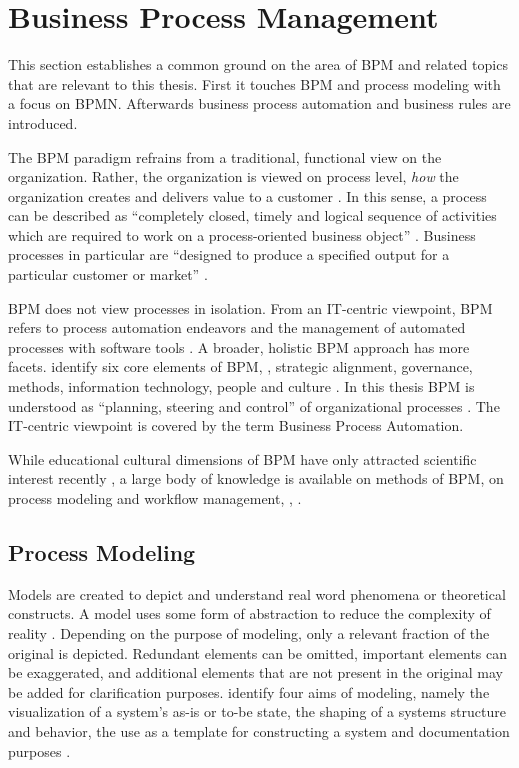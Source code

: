 \pagebreak
\section{Business Process Management}

This section establishes a common ground on the area of \ac{BPM} and related topics that are relevant to this thesis. First it touches \ac{BPM} and process modeling with a focus on \ac{BPMN}. Afterwards business process automation and business rules are introduced.

The \ac{BPM} paradigm refrains from a traditional, functional view on the organization. Rather, the organization is viewed on process level, \ie \textit{how} the organization creates and delivers value to a customer \citep[]{Davenport1993}. In this sense, a process can be described as \enquote{completely closed, timely and logical sequence of activities which are required to work on a process-oriented business object} \citep[]{Becker2003}. Business processes in particular are \enquote{designed to produce a specified output for a particular customer or market} \citep[]{Davenport1993}.

\ac{BPM} does not view processes in isolation. From an IT-centric viewpoint, \ac{BPM} refers to process automation endeavors and the management of automated processes with software tools \citep[]{Harmon2003}.  A broader, holistic \ac{BPM} approach has more facets. \cite{Rosemann2005} identify six core elements of \ac{BPM}, \viz, strategic alignment, governance, methods, information technology, people and culture \citep[see also][]{Rosemann2015}. In this thesis \ac{BPM} is understood as \enquote{planning, steering and control} of organizational processes \citep[]{Becker2003}. The IT-centric viewpoint is covered by the term Business Process Automation.

While educational \resp cultural dimensions of \ac{BPM} have only attracted scientific interest recently  \citep[]{VomBrocke2014a}, a large body of knowledge is available on methods of \ac{BPM}, \esp on process modeling and workflow management, \eg, \cite{Becker2011,Dumas2013,VomBrocke2015,VanderAalst2000}.

\subsection{Process Modeling}

Models are created to depict and understand real word phenomena or theoretical constructs. A model uses some form of abstraction to reduce the complexity of reality \citep[][]{Booch1998}. Depending on the purpose of modeling, only a relevant fraction of the original is depicted. Redundant elements can be omitted, important elements can be exaggerated, and additional elements that are not present in the original may be added for clarification purposes. \cite{Booch1998} identify four aims of modeling, namely the visualization of a system's as-is or to-be state, the shaping of a systems structure and behavior, the use as a template for constructing a system and documentation purposes \citep[]{Booch1998}.

